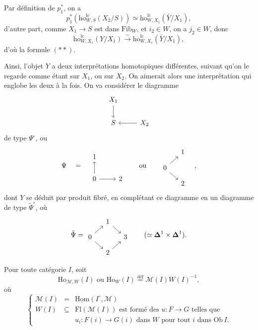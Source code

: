 \documentclass[11pt]{article}
\newcommand{\printedpage}[1]{\marginpar{\footnotesize p.~#1}}
\newcommand{\msp}[1]{\marginpar{\footnotesize [#1]}}
\newcommand{\Homu}{\underline{\mathrm{Hom}}}
\newcommand{\Ho}{\mathrm{Ho}}
\newcommand{\ho}{\mathrm{ho}}
\newcommand{\lc}{\mathrm{lc}}
\begin{document}
\msp{page 242}
Par définition de $p_1^*$, on a
\[
p_1^*(\ho^{\lc}_{W,S}(X_2/S)) \simeq \ho^{\lc}_{W,X_1}(\bar{Y}/X_1),
\]
d'autre part, comme $X_1 \longrightarrow S$ est dans $\mathrm{Fib}_W$, et $i_2 \in W$, on a $j_2 \in W$, donc
\[
\ho^{\lc}_{W,X_1}(Y/X_1) \xrightarrow{\sim} \ho^{\lc}_{W,X_1}(\bar{Y}/X_1),
\]
d'où la formule $(**)$.

Ainsi, l'objet $Y$ a deux interprétations homotopiques différentes, suivant qu'on le regarde comme étant sur $X_1$, ou sur $X_2$. On aimerait alors une interprétation qui englobe les deux à la fois. On va considérer le diagramme
\[
\begin{tikzcd}[ampersand replacement=\&]
X_1 \arrow[d] \& \\
S \& X_2 \arrow[l]
\end{tikzcd}
\]
de type $\Psi^\circ$, ou
\[
\Psi \quad = \quad
\begin{tikzcd}[ampersand replacement=\&]
1 \& \\
0 \arrow[u] \arrow[r] \& 2
\end{tikzcd}
\qquad \text{ou} \qquad
\begin{tikzcd}[ampersand replacement=\&, row sep=small, column sep=small]
 \& 1 \\
0 \arrow[ur] \arrow[dr] \& \\
 \& 2
\end{tikzcd}
\quad ,
\]
\printedpage{157}
dont $Y$ se déduit par produit fibré, en complétant ce diagramme en un diagramme de type $\tilde{\Psi}^\circ$, où
\[
\tilde{\Psi} =
\begin{tikzcd}[ampersand replacement=\&, row sep=small, column sep=small]
 \& 1 \arrow[dr] \& \\
0 \arrow[ur] \arrow[dr] \& \& 3 \\
 \& 2 \arrow[ur] \&
\end{tikzcd}
\qquad (\simeq \boldsymbol{\Delta}^1 \times \boldsymbol{\Delta}^1).
\]

\msp{page 243}
Pour toute catégorie $I$, soit
\[
\Ho_{\mathcal{M},W}(I) \text{ \ ou \ } \Ho_W(I) \overset{\text{déf}}{=} \mathcal{M}(I)W(I)^{-1},
\]
où
\[
\left\{
\begin{array}{rcl}
\mathcal{M}(I) & = & \Homu(I^\circ, \mathcal{M}) \\[1ex]
W(I) & \subseteq & \mathrm{Fl}(\mathcal{M}(I)) \text{ est formé des } u : F \longrightarrow G \text{ telles que} \\[1ex]
 & & u_i : F(i) \longrightarrow G(i) \text{ dans } W \text{ pour tout } i \text{ dans } \mathrm{Ob}\, I.
\end{array}
\right.
\]
\end{document}
